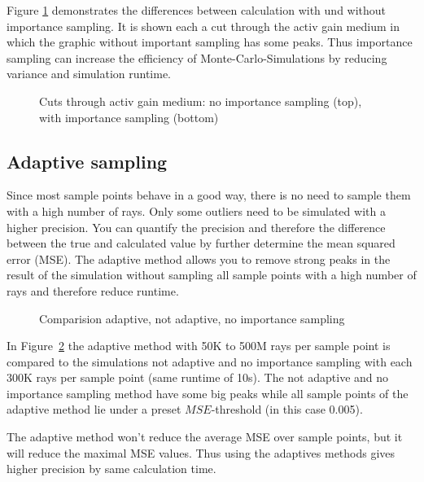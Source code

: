 Figure \ref{graphic:importance} demonstrates
the differences between calculation with und without
importance sampling. It is shown each a cut through the activ 
gain medium in which the graphic without important
sampling has some peaks. Thus importance 
sampling can increase the efficiency of Monte-Carlo-Simulations 
by reducing variance and simulation runtime. 
\begin{figure}
  \centerline
  {}
  \caption{Cuts through activ gain medium: no importance sampling (top), with importance sampling (bottom)}
  \label{graphic:importance}
\end{figure}

\subsection{Adaptive sampling}
Since most sample points behave in a good way, there is no need
to sample them with a high number of rays. Only some outliers need to
be simulated with a higher precision. You can quantify the precision
and therefore the difference between the true and calculated value by
further determine the mean squared error (MSE).
The adaptive method allows you to remove strong peaks in the result
of the simulation without sampling all sample points with
a high number of rays and therefore reduce runtime.
\begin{figure}
  \centerline{
    }
  \caption{Comparision adaptive, not adaptive, no importance sampling}
  \label{plot:adaptive}
\end{figure}

In Figure~\ref{plot:adaptive} the adaptive method with 
50K to 500M rays per sample point is compared to the simulations
not adaptive and no importance sampling with each 300K rays per sample point (same runtime of 10s).
The not adaptive and no importance sampling method have some big peaks while all sample points of 
the adaptive method lie under a preset $MSE$-threshold (in this case 0.005). 

The adaptive method won't reduce the average MSE over sample points,
but it will reduce the maximal MSE values. Thus using the adaptives
methods gives higher precision by same calculation time.



